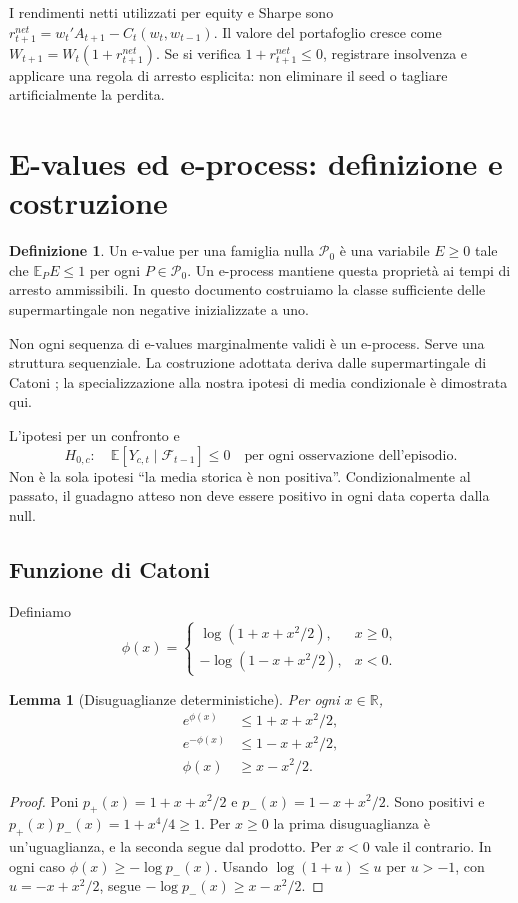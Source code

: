 \documentclass[11pt,a4paper]{article}
\newtheorem{lemma}[theorem]{Lemma}
\theoremstyle{definition}\newtheorem{definition}[theorem]{Definizione}
\theoremstyle{remark}\newtheorem{remark}[theorem]{Osservazione}
\newcommand{\E}{\mathbb E}\newcommand{\PP}{\mathbb P}\newcommand{\R}{\mathbb R}
\newcommand{\F}{\mathcal F}\newcommand{\W}{\mathcal W}\newcommand{\supp}{\operatorname{supp}}
\begin{document}
I rendimenti netti utilizzati per equity e Sharpe sono $r_{t+1}^{net}=w_t'A_{t+1}-C_t(w_t,w_{t-1})$. Il valore del portafoglio cresce come $W_{t+1}=W_t(1+r_{t+1}^{net})$. Se si verifica $1+r_{t+1}^{net}\le0$, registrare insolvenza e applicare una regola di arresto esplicita: non eliminare il seed o tagliare artificialmente la perdita.

\section{E-values ed e-process: definizione e costruzione}
\label{sec:eprocess}
\begin{definition}
Un e-value per una famiglia nulla $\mathcal P_0$ è una variabile $E\ge0$ tale che $\E_P E\le1$ per ogni $P\in\mathcal P_0$. Un e-process mantiene questa proprietà ai tempi di arresto ammissibili. In questo documento costruiamo la classe sufficiente delle supermartingale non negative inizializzate a uno.
\end{definition}
Non ogni sequenza di e-values marginalmente validi è un e-process. Serve una struttura sequenziale. La costruzione adottata deriva dalle supermartingale di Catoni \cite{wr}; la specializzazione alla nostra ipotesi di media condizionale è dimostrata qui.

L'ipotesi per un confronto e
\begin{equation}
 H_{0,c}:\quad \E[Y_{c,t}\mid\F_{t-1}]\le0
 \quad\text{per ogni osservazione dell'episodio}.\label{eq:null}
\end{equation}
Non è la sola ipotesi ``la media storica è non positiva''. Condizionalmente al passato, il guadagno atteso non deve essere positivo in ogni data coperta dalla null.

\subsection{Funzione di Catoni}
Definiamo
\begin{equation}
 \phi(x)=\begin{cases}
 \log(1+x+x^2/2),&x\ge0,\\
 -\log(1-x+x^2/2),&x<0.
 \end{cases}\label{eq:phi}
\end{equation}
\begin{lemma}[Disuguaglianze deterministiche]
Per ogni $x\in\R$,
\begin{align}
 e^{\phi(x)}&\le1+x+x^2/2,\\
 e^{-\phi(x)}&\le1-x+x^2/2,\\
 \phi(x)&\ge x-x^2/2.
\end{align}
\end{lemma}
\begin{proof}
Poni $p_+(x)=1+x+x^2/2$ e $p_-(x)=1-x+x^2/2$. Sono positivi e $p_+(x)p_-(x)=1+x^4/4\ge1$. Per $x\ge0$ la prima disuguaglianza è un'uguaglianza, e la seconda segue dal prodotto. Per $x<0$ vale il contrario. In ogni caso $\phi(x)\ge-\log p_-(x)$. Usando $\log(1+u)\le u$ per $u>-1$, con $u=-x+x^2/2$, segue $-\log p_-(x)\ge x-x^2/2$.
\end{proof}
\end{document}
